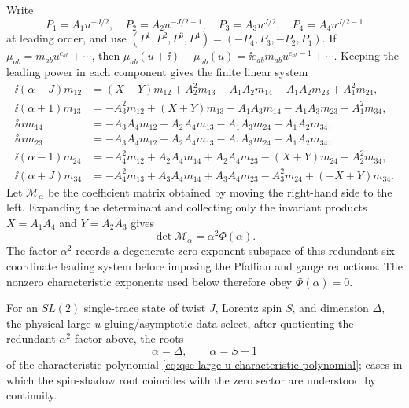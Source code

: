 Write
\[
  P_1=A_1u^{-J/2},\quad
  P_2=A_2u^{-J/2-1},\quad
  P_3=A_3u^{J/2},\quad
  P_4=A_4u^{J/2-1}
\]
at leading order, and use
\((P^1,P^2,P^3,P^4)=(-P_4,P_3,-P_2,P_1)\).  If
\(\mu_{ab}=m_{ab}u^{e_{ab}}+\cdots\), then
\(\mu_{ab}(u+\ii)-\mu_{ab}(u)=\ii e_{ab}m_{ab}u^{e_{ab}-1}+\cdots\).
Keeping the leading power in each component gives the finite linear system
\begin{equation}
\begin{aligned}
  \ii(\alpha-J)m_{12}
  &=(X-Y)m_{12}+A_2^2m_{13}-A_1A_2m_{14}
    -A_1A_2m_{23}+A_1^2m_{24},\\
  \ii(\alpha+1)m_{13}
  &=-A_3^2m_{12}+(X+Y)m_{13}-A_1A_3m_{14}
    -A_1A_3m_{23}+A_1^2m_{34},\\
  \ii\alpha m_{14}
  &=-A_3A_4m_{12}+A_2A_4m_{13}
    -A_1A_3m_{24}+A_1A_2m_{34},\\
  \ii\alpha m_{23}
  &=-A_3A_4m_{12}+A_2A_4m_{13}
    -A_1A_3m_{24}+A_1A_2m_{34},\\
  \ii(\alpha-1)m_{24}
  &=-A_4^2m_{12}+A_2A_4m_{14}+A_2A_4m_{23}
    -(X+Y)m_{24}+A_2^2m_{34},\\
  \ii(\alpha+J)m_{34}
  &=-A_4^2m_{13}+A_3A_4m_{14}+A_3A_4m_{23}
    -A_3^2m_{24}+(-X+Y)m_{34}.
\end{aligned}
  \label{eq:qsc-large-u-characteristic-linear-system}
\end{equation}
Let \(\mathcal M_\alpha\) be the coefficient matrix obtained by moving the
right-hand side to the left.  Expanding the determinant and collecting only
the invariant products \(X=A_1A_4\) and \(Y=A_2A_3\) gives
\[
  \det\mathcal M_\alpha=\alpha^2\Phi(\alpha).
\]
The factor \(\alpha^2\) records a degenerate zero-exponent subspace of this
redundant six-coordinate leading system before imposing the Pfaffian and gauge
reductions.  The nonzero characteristic exponents used below therefore obey
\(\Phi(\alpha)=0\).

\begin{assumption}
\label{ass:qsc-large-u-characteristic-roots}
For an \(SL(2)\) single-trace state of twist \(J\), Lorentz spin \(S\), and
dimension \(\Delta\), the physical large-\(u\) gluing/asymptotic data select,
after quotienting the redundant \(\alpha^2\) factor above, the roots
\[
  \alpha=\Delta,\qquad \alpha=S-1
\]
of the characteristic polynomial
\eqref{eq:qsc-large-u-characteristic-polynomial}; cases in which the
spin-shadow root coincides with the zero sector are understood by continuity.
\end{assumption}

